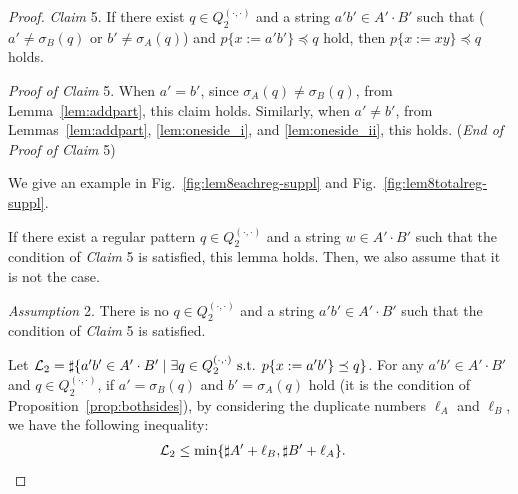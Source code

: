 \begin{proof}
\smallskip

\noindent
\textit{Claim} 5.
If there exist $q \in Q_{2}^{(\cdot,\cdot)}$ and a string $a'b' \in A'\cdot B'$ such that ($a' \not= \sigma_{B}(q)$ or $b' \not= \sigma_{A}(q)$) and $p\{x:=a'b'\} \preceq q$ hold, then $p\{x:=xy\} \preceq q$ holds.
 
\smallskip

\noindent
\textit{Proof of Claim} 5.
When $a'=b'$, since $\sigma_{A}(q) \not= \sigma_{B}(q)$, from Lemma~\ref{lem:addpart}, this claim holds. Similarly, when $a' \not = b'$, from Lemmas~\ref{lem:addpart}, \ref{lem:oneside_i}, and \ref{lem:oneside_ii}, this holds.  (\textit{End of Proof of Claim} 5)

\noindent
{\color{red} We give an example in Fig.~\ref{fig:lem8eachreg-suppl} and Fig.~\ref{fig:lem8totalreg-suppl}.}


\smallskip

\noindent
If there exist a regular pattern $q \in Q_{2}^{(\cdot,\cdot)}$ and a string $w \in A'\cdot B'$ such that the condition of \textit{Claim} 5 is satisfied, this lemma holds. Then, we also assume that it is not the case.

\smallskip

\noindent
\textit{Assumption} 2.
There is no $q \in Q_{2}^{(\cdot,\cdot)}$ and a string $a'b' \in A'\cdot B'$ such that the condition of \textit{Claim} 5 is satisfied.

\smallskip

\noindent
Let ${\cal L}_{2} = \sharp\{a'b' \in A'\cdot B' \mid \exists q \in Q_{2}^{(\cdot,\cdot)} \mbox{ s.t. } p\{x:=a'b'\} \preceq q\}$.
For any $a'b' \in A'\cdot B'$ and $q \in Q_{2}^{(\cdot,\cdot)}$, if $a' = \sigma_{B}(q)$ and $b' = \sigma_{A}(q)$ hold (it is the condition of Proposition~\ref{prop:bothsides}), by considering the duplicate numbers $\ell_{A}$ and $\ell_{B}$, we have the following inequality:
\begin{align*}
  {\cal L}_{2} &\leq \min\{\sharp A' + \ell_{B}, \sharp B' + \ell_{A}\}.
\end{align*}


\end{proof}
